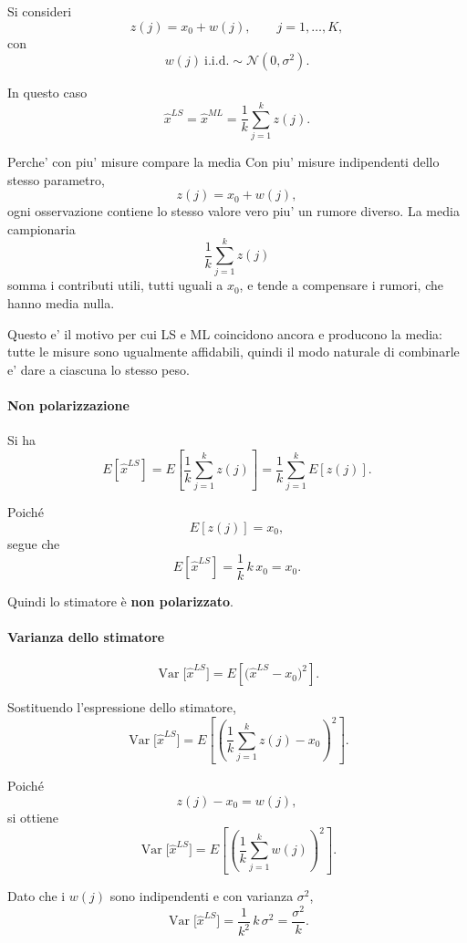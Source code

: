 \documentclass[11pt,a4paper]{article}
\begin{document}
Si consideri
\[
z(j)=x_0+w(j),
\qquad j=1,\dots,K,
\]
con
\[
w(j)\ \text{i.i.d.} \sim \mathcal{N}(0,\sigma^2).
\]

In questo caso
\[
\hat x^{LS}=\hat x^{ML}
=
\frac{1}{k}\sum_{j=1}^{k} z(j).
\]

\begin{spiegazione}{Perche' con piu' misure compare la media}
Con piu' misure indipendenti dello stesso parametro,
\[
z(j)=x_0+w(j),
\]
ogni osservazione contiene lo stesso valore vero piu' un rumore diverso. La media campionaria
\[
\frac{1}{k}\sum_{j=1}^{k}z(j)
\]
somma i contributi utili, tutti uguali a $x_0$, e tende a compensare i rumori, che hanno media nulla.

Questo e' il motivo per cui LS e ML coincidono ancora e producono la media: tutte le misure sono ugualmente affidabili, quindi il modo naturale di combinarle e' dare a ciascuna lo stesso peso.
\end{spiegazione}

\paragraph{Non polarizzazione}

Si ha
\[
E[\hat x^{LS}]
=
E\!\left[
\frac{1}{k}\sum_{j=1}^{k} z(j)
\right]
=
\frac{1}{k}\sum_{j=1}^{k} E[z(j)].
\]

Poiché
\[
E[z(j)] = x_0,
\]
segue che
\[
E[\hat x^{LS}]
=
\frac{1}{k}\,k\,x_0
=
x_0.
\]

Quindi lo stimatore è \textbf{non polarizzato}.

\paragraph{Varianza dello stimatore}

\[
\operatorname{Var}\!\bigl[\hat x^{LS}\bigr]
=
E\!\left[
\bigl(\hat x^{LS}-x_0\bigr)^2
\right].
\]

Sostituendo l'espressione dello stimatore,
\[
\operatorname{Var}\!\bigl[\hat x^{LS}\bigr]
=
E\!\left[
\left(
\frac{1}{k}\sum_{j=1}^{k} z(j)-x_0
\right)^2
\right].
\]

Poiché
\[
z(j)-x_0 = w(j),
\]
si ottiene
\[
\operatorname{Var}\!\bigl[\hat x^{LS}\bigr]
=
E\!\left[
\left(
\frac{1}{k}\sum_{j=1}^{k} w(j)
\right)^2
\right].
\]

Dato che i \(w(j)\) sono indipendenti e con varianza \(\sigma^2\),
\[
\operatorname{Var}\!\bigl[\hat x^{LS}\bigr]
=
\frac{1}{k^2}\,k\,\sigma^2
=
\frac{\sigma^2}{k}.
\]
\end{document}
